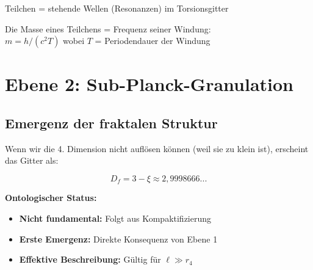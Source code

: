 	\begin{important}
		Teilchen = stehende Wellen (Resonanzen) im Torsionsgitter
		
		\vspace{0.3cm}
		
		
		\vspace{0.3cm}
		
		Die Masse eines Teilchens = Frequenz seiner Windung:\\
		$m = h/(c^2 T)$ wobei $T$ = Periodendauer der Windung
	\end{important}
	
	\section{Ebene 2: Sub-Planck-Granulation}
	
	\subsection{Emergenz der fraktalen Struktur}
	
	Wenn wir die 4. Dimension nicht auflösen können (weil sie zu klein ist), erscheint das Gitter als:
	
	\begin{equation}
		\boxed{D_f = 3 - \xi \approx 2{,}9998666...}
	\end{equation}
	
	\textbf{Ontologischer Status:}
	\begin{itemize}
		\item \textbf{Nicht fundamental:} Folgt aus Kompaktifizierung
		\item \textbf{Erste Emergenz:} Direkte Konsequenz von Ebene 1
		\item \textbf{Effektive Beschreibung:} Gültig für $\ell \gg r_4$
	\end{itemize}
	
